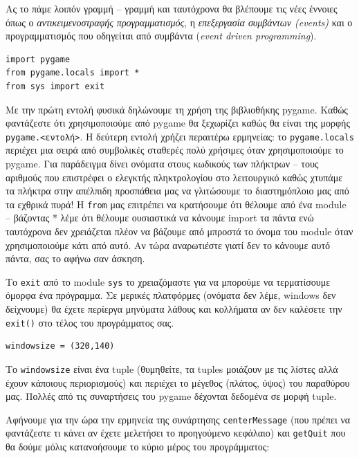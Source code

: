Ας το πάμε λοιπόν γραμμή -- γραμμή και ταυτόχρονα θα βλέπουμε τις νέες έννοιες όπως ο {\em αντικειμενοστραφής προγραμματισμός}, η {\em επεξεργασία συμβάντων (events)} και ο προγραμματισμός που οδηγείται από συμβάντα ({\em event driven programming}).

\begin{verbatim}
import pygame
from pygame.locals import *
from sys import exit
\end{verbatim}

Με την πρώτη εντολή φυσικά δηλώνουμε τη χρήση της βιβλιοθήκης pygame. Καθώς φαντάζεστε ότι χρησιμοποιούμε από pygame θα ξεχωρίζει καθώς θα είναι της μορφής {\tt pygame.<εντολή>}. H δεύτερη εντολή χρήζει περαιτέρω ερμηνείας: το {\tt pygame.locals} περιέχει μια σειρά από συμβολικές σταθερές πολύ χρήσιμες όταν χρησιμοποιούμε το pygame. Για παράδειγμα δίνει ονόματα στους κωδικούς των πλήκτρων -- τους αριθμούς που επιστρέφει ο ελεγκτής πληκτρολογίου στο λειτουργικό καθώς χτυπάμε τα πλήκτρα στην απέλπιδη προσπάθεια μας να γλιτώσουμε το διαστημόπλοιο μας από τα εχθρικά πυρά! H {\tt from} μας επιτρέπει να κρατήσουμε ότι θέλουμε από ένα module -- βάζοντας * λέμε ότι θέλουμε ουσιαστικά να κάνουμε import τα πάντα ενώ ταυτόχρονα δεν χρειάζεται πλέον να βάζουμε από μπροστά το όνομα του module όταν χρησιμοποιούμε κάτι από αυτό. Αν τώρα αναρωτιέστε γιατί δεν το κάνουμε αυτό πάντα, σας το αφήνω σαν άσκηση.

 Το {\tt exit} από το module {\tt sys} το χρειαζόμαστε για να μπορούμε να τερματίσουμε όμορφα ένα πρόγραμμα. Σε μερικές πλατφόρμες (ονόματα δεν λέμε, windows δεν δείχνουμε) θα έχετε περίεργα μηνύματα λάθους και κολλήματα αν δεν καλέσετε την {\tt exit()} στο τέλος του προγράμματος σας.

\begin{verbatim}
windowsize = (320,140)
\end{verbatim}

Το {\tt windowsize} είναι ένα tuple (θυμηθείτε, τα tuples μοιάζουν με τις λίστες αλλά έχουν κάποιους περιορισμούς) και περιέχει το μέγεθος (πλάτος, ύψος) του παραθύρου μας. Πολλές από τις συναρτήσεις του pygame δέχονται δεδομένα σε μορφή tuple.

Αφήνουμε για την ώρα την ερμηνεία της συνάρτησης {\tt centerMessage} (που πρέπει να φαντάζεστε τι κάνει αν έχετε μελετήσει το προηγούμενο κεφάλαιο) και {\tt getQuit} που θα δούμε μόλις κατανοήσουμε το κύριο μέρος του προγράμματος:


